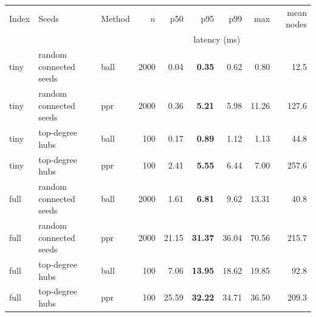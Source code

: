 \begin{tabular}{lllrrrrrr}
\toprule
Index & Seeds & Method & $n$ & p50 & p95 & p99 & max & mean nodes \\
 & & & & \multicolumn{4}{c}{latency (ms)} & \\
\midrule
tiny & random connected seeds & ball & 2000 & 0.04 & \textbf{0.35} & 0.62 & 0.80 & 12.5 \\
tiny & random connected seeds & ppr & 2000 & 0.36 & \textbf{5.21} & 5.98 & 11.26 & 127.6 \\
tiny & top-degree hubs & ball & 100 & 0.17 & \textbf{0.89} & 1.12 & 1.13 & 44.8 \\
tiny & top-degree hubs & ppr & 100 & 2.41 & \textbf{5.55} & 6.44 & 7.00 & 257.6 \\
\midrule
full & random connected seeds & ball & 2000 & 1.61 & \textbf{6.81} & 9.62 & 13.31 & 40.8 \\
full & random connected seeds & ppr & 2000 & 21.15 & \textbf{31.37} & 36.04 & 70.56 & 215.7 \\
full & top-degree hubs & ball & 100 & 7.06 & \textbf{13.95} & 18.62 & 19.85 & 92.8 \\
full & top-degree hubs & ppr & 100 & 25.59 & \textbf{32.22} & 34.71 & 36.50 & 209.3 \\
\bottomrule
\end{tabular}
